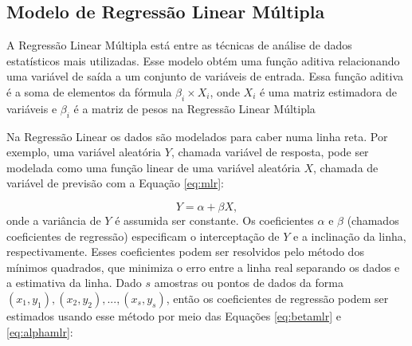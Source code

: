 \subsection{Modelo de Regressão Linear Múltipla}

A Regressão Linear Múltipla está entre as técnicas de análise de dados estatísticos mais utilizadas. Esse modelo obtém uma função aditiva relacionando uma variável de saída a um conjunto de variáveis de entrada. Essa função aditiva é a soma de elementos da fórmula $\beta_i \times X_i$, onde $X_i$ é uma matriz estimadora de variáveis e $\beta_i$ é a matriz de pesos na Regressão Linear Múltipla \cite{torgo2003data}

Na Regressão Linear os dados são modelados para caber numa linha reta. Por exemplo, uma variável aleatória $Y$, chamada variável de resposta, pode ser modelada como uma função linear de uma variável aleatória $X$, chamada de variável de previsão com a Equação \ref{eq:mlr}:

\begin{equation}
\label{eq:mlr}
Y = \alpha + \beta X,
\end{equation}
onde a variância de $Y$ \label{symbol:varaleatoriaY} é assumida ser constante. Os coeficientes $\alpha$ \label{symbol:coefregindep} e $\beta$ \label{symbol:coefregdep} (chamados coeficientes de regressão) especificam o interceptação de $Y$ e a inclinação da linha, respectivamente. Esses coeficientes podem ser resolvidos pelo método dos mínimos quadrados, que minimiza o erro entre a linha real separando os dados e a estimativa da linha. Dado $s$ amostras ou pontos de dados da forma  $(x_1,y_1), (x_2,y_2), ..., (x_s,y_s)$, então os coeficientes de regressão podem ser estimados usando esse método por meio das Equações \ref{eq:betamlr} e \ref{eq:alphamlr}:

